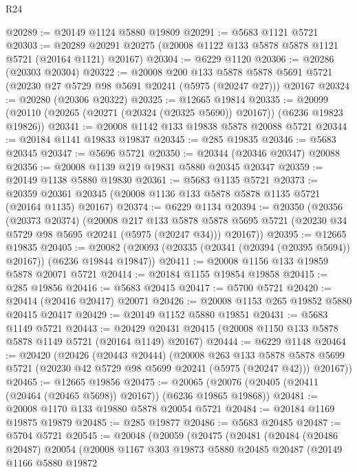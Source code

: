 \begin{lexlean}{R24}
\begin{coremodule}
@20289 := @20149 @1124 @5880 @19809
@20291 := @5683 @1121 @5721
@20303 := @20289 @20291 @20275 (@20008 @1122 @133 @5878 @5878 @1121 @5721 (@20164 @1121) @20167)
@20304 := @6229 @1120
@20306 := @20286 (@20303 @20304)
@20322 := @20008
    @200
    @133
    @5878
    @5878
    @5691
    @5721
    (@20230 @27 @5729 @98 @5691 @20241 (@5975 (@20247 @27)))
    @20167
@20324 := @20280 (@20306 @20322)
@20325 := @12665 @19814
@20335 := @20099 (@20110 (@20265 (@20271 (@20324 (@20325 @5690)) @20167)) (@6236 @19823 @19826))
@20341 := @20008 @1142 @133 @19838 @5878 @20088 @5721
@20344 := @20184 @1141 @19833 @19837
@20345 := @285 @19835
@20346 := @5683 @20345
@20347 := @5696 @5721
@20350 := @20344 (@20346 @20347) @20088
@20356 := @20008 @1139 @219 @19831 @5880 @20345 @20347
@20359 := @20149 @1138 @5880 @19830
@20361 := @5683 @1135 @5721
@20373 := @20359 @20361 @20345 (@20008 @1136 @133 @5878 @5878 @1135 @5721 (@20164 @1135) @20167)
@20374 := @6229 @1134
@20394 := @20350
    (@20356
      (@20373 @20374)
      (@20008
        @217
        @133
        @5878
        @5878
        @5695
        @5721
        (@20230 @34 @5729 @98 @5695 @20241 (@5975 (@20247 @34)))
        @20167))
@20395 := @12665 @19835
@20405 := @20082 (@20093 (@20335 (@20341 (@20394 (@20395 @5694)) @20167)) (@6236 @19844 @19847))
@20411 := @20008 @1156 @133 @19859 @5878 @20071 @5721
@20414 := @20184 @1155 @19854 @19858
@20415 := @285 @19856
@20416 := @5683 @20415
@20417 := @5700 @5721
@20420 := @20414 (@20416 @20417) @20071
@20426 := @20008 @1153 @265 @19852 @5880 @20415 @20417
@20429 := @20149 @1152 @5880 @19851
@20431 := @5683 @1149 @5721
@20443 := @20429 @20431 @20415 (@20008 @1150 @133 @5878 @5878 @1149 @5721 (@20164 @1149) @20167)
@20444 := @6229 @1148
@20464 := @20420
    (@20426
      (@20443 @20444)
      (@20008
        @263
        @133
        @5878
        @5878
        @5699
        @5721
        (@20230 @42 @5729 @98 @5699 @20241 (@5975 (@20247 @42)))
        @20167))
@20465 := @12665 @19856
@20475 := @20065 (@20076 (@20405 (@20411 (@20464 (@20465 @5698)) @20167)) (@6236 @19865 @19868))
@20481 := @20008 @1170 @133 @19880 @5878 @20054 @5721
@20484 := @20184 @1169 @19875 @19879
@20485 := @285 @19877
@20486 := @5683 @20485
@20487 := @5704 @5721
@20545 := @20048
    (@20059
      (@20475
        (@20481
          (@20484
            (@20486 @20487)
            @20054
            (@20008
              @1167
              @303
              @19873
              @5880
              @20485
              @20487
              (@20149
                @1166
                @5880
                @19872

\end{coremodule}
\end{lexlean}
